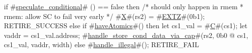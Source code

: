 if #\hyperref[sailRISCVzspeculatezyconditional]{speculate\_conditional}# () == false then {
  /* should only happen in rmem
   * rmem: allow SC to fail very early
   */
  #\hyperref[sailRISCVzX]{X}#(rs2) = #\hyperref[sailRISCVzEXTZ]{EXTZ}#(0b1);
  RETIRE_SUCCESS
} else if #\hyperref[sailRISCVzhaveAtomics]{haveAtomics}#() then {
  let cs1_val = #\hyperref[sailRISCVzC]{C}#(cs1);
  let vaddr = cs1_val.address;
  #\hyperref[sailRISCVzhandlezystorezycondzydatazyviazycap]{handle\_store\_cond\_data\_via\_cap}#(rs2, 0b0 @ cs1, cs1_val, vaddr, width)
} else {
  #\hyperref[sailRISCVzhandlezyillegal]{handle\_illegal}#();
  RETIRE_FAIL
}
